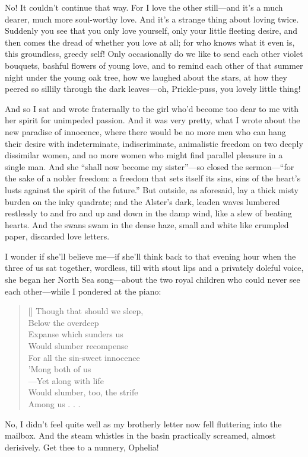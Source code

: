 \documentclass[12pt,a4paper]{article}
\begin{document}
No! It couldn’t continue that way. For I love the other still—and it’s a much dearer, much more soul-worthy love. And it’s a strange thing about loving twice. Suddenly you see that you only love yourself, only your little fleeting desire, and then comes the dread of whether you love at all; for who knows what it even is, this groundless, greedy self! Only occasionally do we like to send each other violet bouquets, bashful flowers of young love, and to remind each other of that summer night under the young oak tree, how we laughed about the stars, at how they peered so sillily through the dark leaves—oh, Prickle-puss, you lovely little thing! 

And so I sat and wrote fraternally to the girl who’d become too dear to me with her spirit for unimpeded passion. And it was very pretty, what I wrote about the new paradise of innocence, where there would be no more men who can hang their desire with indeterminate, indiscriminate, animalistic freedom on two deeply dissimilar women, and no more women who might find parallel pleasure in a single man. And she “shall now become my sister”—so closed the sermon—“for the sake of a nobler freedom: a freedom that sets itself its sins, sins of the heart’s lusts against the spirit of the future.” But outside, as aforesaid, lay a thick misty burden on the inky quadrate; and the Alster’s dark, leaden waves lumbered restlessly to and fro and up and down in the damp wind, like a slew of beating hearts. And the swans swam in the dense haze, small and white like crumpled paper, discarded love letters.

I wonder if she’ll believe me—if she’ll think back to that evening hour when the three of us sat together, wordless, till with stout lips and a privately doleful voice, she began her North Sea song—about the two royal children who could never see each other—while I pondered at the piano:
\settowidth{\versewidth}{For all the sin-sweet innocence}
\begin{verse}[\versewidth]
Though that should we sleep, \\
Below the overdeep \\
Expanse which sunders us \\
Would slumber recompense \\
For all the sin-sweet innocence \\
’Mong both of us \\
—Yet along with life \\
Would slumber, too, the strife \\
Among us . . .
\end{verse}
No, I didn’t feel quite well as my brotherly letter now fell fluttering into the mailbox. And the steam whistles in the basin practically screamed, almost derisively. Get thee to a nunnery, Ophelia!
\end{document}
